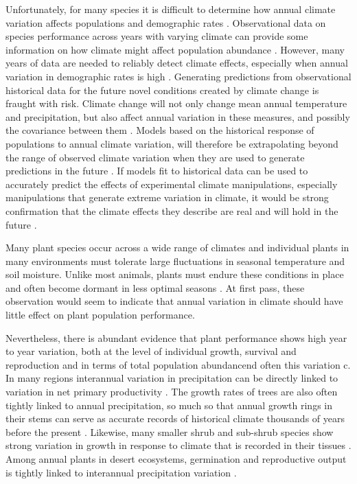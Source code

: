\documentclass[11pt]{article}
\begin{document}
\begin{doublespacing}
Unfortunately, for many species it is difficult to determine how annual climate variation affects populations and demographic rates \citep{teller_linking_2016, ehrlen_advancing_2016}. Observational data on species performance across years with varying climate can provide some information on how climate might affect population abundance \citep{dalgleish_climate_2010,ehrlen_advancing_2016}. However, many years of data are needed to reliably detect climate effects, especially when annual variation in demographic rates is high \citep{teller_linking_2016,gerber_optimal_2015}. Generating predictions from observational historical data for the future novel conditions created by climate change is fraught with risk. Climate change will not only change mean annual temperature and precipitation, but also affect annual variation in these measures, and possibly the covariance between them \citep{}. Models based on the historical response of populations to annual climate variation, will therefore be extrapolating beyond the range of observed climate variation when they are used to generate predictions in the future \citep{}. If models fit to historical data can be used to accurately predict the effects of experimental climate manipulations, especially manipulations that generate extreme variation in climate, it would be strong confirmation that the climate effects they describe are real and will hold in the future \cite{adler_can_the_past_2014}.  

Many plant species occur across a wide range of climates \cite{} and individual plants in many environments must tolerate large fluctuations in seasonal temperature and soil moisture.   Unlike most animals, plants must endure these conditions in place and often become dormant in less optimal seasons \textit{}. At first pass, these observation would seem to indicate that annual variation in climate should have little effect on plant population performance. 

Nevertheless, there is abundant evidence that plant performance shows high year to year variation, both at the level of individual growth, survival and reproduction and in terms of total population abundancend often this variation c. In many regions interannual variation in precipitation can be directly linked to variation in net primary productivity \citep{knapp and smith, Hsu and Adler}. The growth rates of trees are also often tightly linked to annual precipitation, so much so that annual growth rings in their stems can serve as accurate records of historical climate thousands of years before the present \citep{yang}.  Likewise, many smaller shrub and sub-shrub species show strong variation in growth in response to climate that is recorded in their tissues \citep{Franklin, Srur}. Among annual plants in desert ecosystems, germination and reproductive output is tightly linked to interannual precipitation variation \citep{venables}.



\end{doublespacing}
\end{document}
